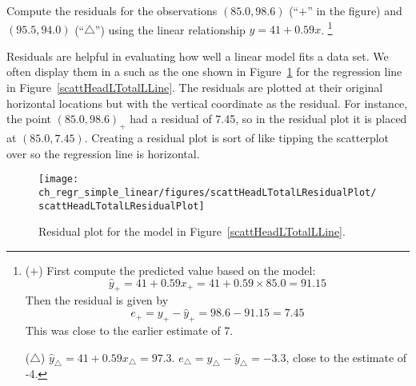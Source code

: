 \begin{exercise}
Compute the residuals for the observations $(85.0, 98.6)$ (``$+$'' in the figure) and $(95.5, 94.0)$ (``$\triangle$'') using the linear relationship $\hat{y} = 41 + 0.59x$. \footnote{($+$) First compute the predicted value based on the model: $$\hat{y}_{+} = 41+0.59x_{+} = 41+0.59\times 85.0 = 91.15$$ Then the residual is given by $$e_{+} = y_{+} - \hat{y}_{+} = 98.6-91.15=7.45$$This was close to the earlier estimate of 7.

($\triangle$) $\hat{y}_{\triangle} = 41+0.59x_{\triangle} = 97.3$. $e_{\triangle} = y_{\triangle} - \hat{y}_{\triangle} = -3.3$, close to the estimate of -4.}
\end{exercise}

Residuals are helpful in evaluating how well a linear model fits a data set. We often display them in a  such as the one shown in Figure~\ref{scattHeadLTotalLResidualPlot} for the regression line in Figure~\ref{scattHeadLTotalLLine}. The residuals are plotted at their original horizontal locations but with the vertical coordinate as the residual. For instance, the point $(85.0,98.6)_{+}$ had a residual of 7.45, so in the residual plot it is placed at $(85.0, 7.45)$. Creating a residual plot is sort of like tipping the scatterplot over so the regression line is horizontal. 

\begin{figure}
   \centering
   \texttt{[image: ch\_regr\_simple\_linear/figures/scattHeadLTotalLResidualPlot/scattHeadLTotalLResidualPlot]}
   \caption{Residual plot for the model in Figure~\ref{scattHeadLTotalLLine}.}
   \label{scattHeadLTotalLResidualPlot}
\end{figure}

